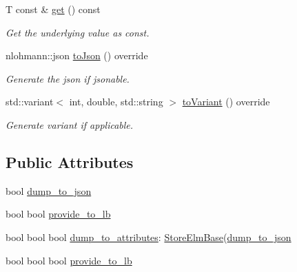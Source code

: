\begin{DoxyCompactItemize}
T const  \& \hyperlink{structvt_1_1vrt_1_1collection_1_1storage_1_1_store_elm_3_01_t_00_01typename_01std_1_1enable__if_947e0655769addb625fb511f777768bd_afd8bb1f887dfb0a9d165693b1c7040ae}{get} () const
\begin{DoxyCompactList}\small\item\em Get the underlying value as const. \end{DoxyCompactList}\item 
nlohmann\+::json \hyperlink{structvt_1_1vrt_1_1collection_1_1storage_1_1_store_elm_3_01_t_00_01typename_01std_1_1enable__if_947e0655769addb625fb511f777768bd_aea4bf3c797fb58b2e53fcbf6010c31d1}{to\+Json} () override
\begin{DoxyCompactList}\small\item\em Generate the json if jsonable. \end{DoxyCompactList}\item 
std\+::variant$<$ int, double, std\+::string $>$ \hyperlink{structvt_1_1vrt_1_1collection_1_1storage_1_1_store_elm_3_01_t_00_01typename_01std_1_1enable__if_947e0655769addb625fb511f777768bd_a7eea2c008b62018472a0b5f544320788}{to\+Variant} () override
\begin{DoxyCompactList}\small\item\em Generate variant if applicable. \end{DoxyCompactList}\end{DoxyCompactItemize}
\subsection*{Public Attributes}
\begin{DoxyCompactItemize}
\item 
bool \hyperlink{structvt_1_1vrt_1_1collection_1_1storage_1_1_store_elm_3_01_t_00_01typename_01std_1_1enable__if_947e0655769addb625fb511f777768bd_aad3ecc5effe2f7965a083da05ffa4c5f}{dump\+\_\+to\+\_\+json}
\item 
bool bool \hyperlink{structvt_1_1vrt_1_1collection_1_1storage_1_1_store_elm_3_01_t_00_01typename_01std_1_1enable__if_947e0655769addb625fb511f777768bd_a97c2111aad25f504ad9e1fd0744d8700}{provide\+\_\+to\+\_\+lb}
\item 
bool bool bool \hyperlink{structvt_1_1vrt_1_1collection_1_1storage_1_1_store_elm_3_01_t_00_01typename_01std_1_1enable__if_947e0655769addb625fb511f777768bd_af352620c897d411d0c441c5cdbdac8c8}{dump\+\_\+to\+\_\+attributes}\+: \hyperlink{structvt_1_1vrt_1_1collection_1_1storage_1_1_store_elm_base}{Store\+Elm\+Base}(\hyperlink{structvt_1_1vrt_1_1collection_1_1storage_1_1_store_elm_3_01_t_00_01typename_01std_1_1enable__if_947e0655769addb625fb511f777768bd_aad3ecc5effe2f7965a083da05ffa4c5f}{dump\+\_\+to\+\_\+json}
\item 
bool bool bool \hyperlink{structvt_1_1vrt_1_1collection_1_1storage_1_1_store_elm_3_01_t_00_01typename_01std_1_1enable__if_947e0655769addb625fb511f777768bd_a6bc795de363ad1a083bce0768d938e35}{provide\+\_\+to\+\_\+lb}
\end{DoxyCompactItemize}
